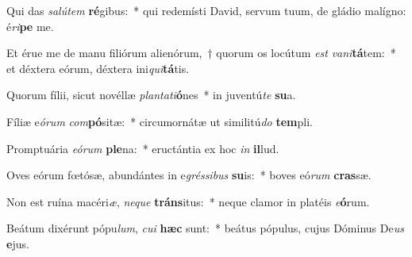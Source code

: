 \item Qui das \textit{sa}\textit{lú}\textit{tem} \textbf{ré}gibus:~* qui redemísti David, servum tuum, de gládio malígno: é\textit{ri}\textbf{pe} me.
\item Et érue me de manu filiórum alienórum,~† quorum os locútum \textit{est} \textit{va}\textit{ni}\textbf{tá}tem:~* et déxtera eórum, déxtera ini\textit{qui}\textbf{tá}tis.
\item Quorum fílii, sicut novéllæ \textit{plan}\textit{ta}\textit{ti}\textbf{ó}nes~* in juventú\textit{te} \textbf{su}a.
\item Fíliæ e\textit{ó}\textit{rum} \textit{com}\textbf{pó}sitæ:~* circumornátæ ut similitú\textit{do} \textbf{tem}pli.
\item Promptuária \textit{e}\textit{ó}\textit{rum} \textbf{ple}na:~* eructántia ex hoc \textit{in} \textbf{il}lud.
\item Oves eórum fœtósæ, abundántes in e\textit{grés}\textit{si}\textit{bus} \textbf{su}is:~* boves eó\textit{rum} \textbf{cras}sæ.
\item Non est ruína macéri\textit{æ}, \textit{ne}\textit{que} \textbf{tráns}itus:~* neque clamor in platéis \textit{e}\textbf{ó}rum.
\item Beátum dixérunt pópu\textit{lum}, \textit{cu}\textit{i} \textbf{hæc} sunt:~* beátus pópulus, cujus Dóminus De\textit{us} \textbf{e}jus.
